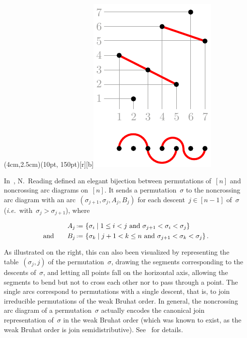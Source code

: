 \documentclass{amsart}
\theoremstyle{definition}
\newcommand{\set}[2]{\left\{ #1 \;\middle|\; #2 \right\}} %
\newcommand{\eqdef}{\mbox{\,\raisebox{0.2ex}{\scriptsize\ensuremath{\mathrm:}}\ensuremath{=}\,}} %
\newcommand{\ie}{\textit{i.e.}~} %
\begin{document}
\vspace{-.1cm}
\parpic(4cm,2.5cm)(10pt, 150pt)[r][b]{\includegraphics[scale=.9]{arcDiagram}}{
In~\cite{Reading-arcDiagrams}, N.~Reading defined an elegant bijection between permutations of~$[n]$ and noncrossing arc diagrams on~$[n]$.
It sends a permutation~$\sigma$ to the noncrossing arc diagram with an arc~$(\sigma_{j+1}, \sigma_j, A_j, B_j)$ for each descent~$j \in [n-1]$ of~$\sigma$ (\ie with~$\sigma_j > \sigma_{j+1}$), where

\vspace{-.2cm}
\begin{minipage}{10cm}
\begin{align*}
A_j & \eqdef \set{\sigma_i}{1 \le i < j \text{ and } \sigma_{j+1} < \sigma_i < \sigma_j} \\
\text{and} \qquad
B_j & \eqdef \set{\sigma_k}{j+1 < k \le n \text{ and } \sigma_{j+1} < \sigma_k < \sigma_j}.
\end{align*}
\end{minipage}

\vspace{.2cm}
\noindent
As illustrated on the right, this can also been visualized by representing the table~$(\sigma_j,j)$ of the permutation~$\sigma$, drawing the segments corresponding to the descents of~$\sigma$, and letting all points fall on the horizontal axis, allowing the segments to bend but not to cross each other nor to pass through a point.
The single arcs correspond to permutations with a single descent, that is, to join irreducible permutations of the weak Bruhat order.
In general, the noncrossing arc diagram of a permutation~$\sigma$ actually encodes the canonical join representation of~$\sigma$ in the weak Bruhat order (which was known to exist, as the weak Bruhat order is join semidistributive).
See~\cite{Reading-arcDiagrams} for details.
}
\end{document}
